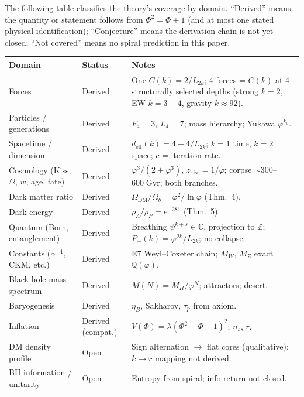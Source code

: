 \documentclass[12pt,a4paper]{article}
\begin{document}
The following table classifies the theory's coverage by domain. ``Derived'' means the quantity or statement follows from $\Phi^2 = \Phi + 1$ (and at most one stated physical identification); ``Conjecture'' means the derivation chain is not yet closed; ``Not covered'' means no spiral prediction in this paper.
\begin{center}
\scriptsize
\begin{tabular}{|l|l|p{4.6cm}|}
\hline
\textbf{Domain} & \textbf{Status} & \textbf{Notes} \\
\hline
Forces & Derived & One $C(k)=2/L_{2k}$; 4 forces = $C(k)$ at 4 structurally selected depths (strong $k{=}2$, EW $k{=}3{-}4$, gravity $k{\approx}92$). \\
Particles / generations & Derived & $F_4=3$, $L_4=7$; mass hierarchy; Yukawa $\varphi^{k_0}$. \\
Spacetime / dimension & Derived & $d_{\mathrm{eff}}(k)=4-4/L_{2k}$; $k=1$ time, $k=2$ space; $c$ = iteration rate. \\
Cosmology (Kiss, $\Omega$, $w$, age, fate) & Derived & $\varphi^3/(2{+}\varphi^3)$, $z_{\mathrm{kiss}}=1/\varphi$; corpse $\sim 300$--$600\;\mathrm{Gyr}$; both branches. \\
Dark matter ratio & Derived & $\Omega_{\mathrm{DM}}/\Omega_b = \varphi^2/\ln\varphi$ (Thm.~4). \\
Dark energy & Derived & $\rho_\Lambda/\rho_P = e^{-281}$ (Thm.~5). \\
Quantum (Born, entanglement) & Derived & Breathing $\psi^{k+s} \in \mathbb{C}$, projection to $\mathbb{Z}$; $P_+(k)=\varphi^{2k}/L_{2k}$; no collapse. \\
Constants ($\alpha^{-1}$, CKM, etc.) & Derived & E7 Weyl--Coxeter chain; $M_W$, $M_Z$ exact $\mathbb{Q}(\varphi)$. \\
Black hole mass spectrum & Derived & $M(N)=M_H/\varphi^N$; attractors; desert. \\
Baryogenesis & Derived & $\eta_B$, Sakharov, $\tau_p$ from axiom. \\
Inflation & Derived (compat.) & $V(\Phi)=\lambda(\Phi^2{-}\Phi{-}1)^2$; $n_s$, $r$. \\
DM density profile & Open & Sign alternation $\to$ flat cores (qualitative); $k \to r$ mapping not derived. \\
BH information / unitarity & Open & Entropy from spiral; info return not closed. \\
\hline
\end{tabular}
\end{center}
\end{document}
